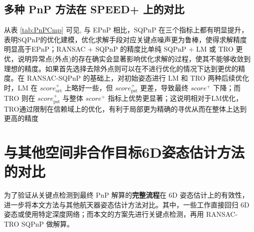 \subsection{多种 PnP 方法在 SPEED+ 上的对比}
\begin{table*}[!htbp]
	\centering
	\caption{在SPEED+合成数据集上的PnP算法对比}
	\label{tab:PnPCmp}
\end{table*}

从表 \ref{tab:PnPCmp} 可见, 与 EPnP 相比，SQPnP 在三个指标上都有明显提升，表明SQPnP的优化建模，优化求解手段对应关键点噪声更为鲁棒，使得求解精度明显高于EPnP；RANSAC + SQPnP 的精度比单纯 SQPnP + LM 或 TRO 更优，说明异常点(外点)的存在确实会显著影响优化求解的过程，使其不能够收敛到理想的精度。如果首先选择去除外点则可以在不进行优化的情况下达到更优的精度。在 RANSAC-SQPnP 的基础上，对初始姿态进行 LM 和 TRO 两种后续优化时，LM 在 $score_{\text{ort}}^+$ 上略好一些，但 $score_{\text{pst}}^+$ 更差，导致最终 $score^+$ 下降；而 TRO 则在 $score_{\text{pst}}^+$ 与整体 $score^+$ 指标上优势更显著；这说明相对于LM优化，TRO通过限制在信赖域上的优化，有利于局部更为精确的寻优从而在整体上达到更高的精度


\section{与其他空间非合作目标6D姿态估计方法的对比}
\label{sec:RANSAC-TRO-SQPnP:OthersCompare}
为了验证从关键点检测到最终 PnP 解算的\textbf{完整流程}在 6D 姿态估计上的有效性，进一步将本文方法与其他航天器姿态估计方法对比。其中，一些工作直接回归 6D 姿态或使用特定深度网络；而本文的方案先进行关键点检测，再用 RANSAC-TRO SQPnP 做解算。

